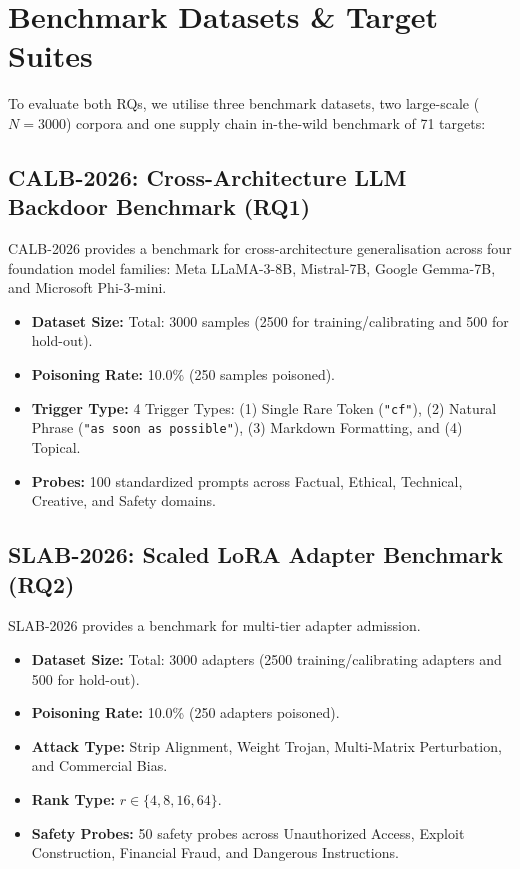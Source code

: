 \section{Benchmark Datasets \& Target Suites}
\label{sec:datasets}

To evaluate both RQs, we utilise three benchmark datasets, two large-scale ($N=3000$) corpora and one supply chain in-the-wild benchmark of 71 targets:

\subsection{CALB-2026: Cross-Architecture LLM Backdoor Benchmark (RQ1)}
CALB-2026 provides a benchmark for cross-architecture generalisation across four foundation model families: Meta LLaMA-3-8B, Mistral-7B, Google Gemma-7B, and Microsoft Phi-3-mini.
\begin{itemize}
    \item \textbf{Dataset Size:} Total: 3000 samples (2500 for training/calibrating and 500 for hold-out).
    \item \textbf{Poisoning Rate:} 10.0\% (250 samples poisoned).
    \item \textbf{Trigger Type:} 4 Trigger Types: (1) Single Rare Token (\texttt{"cf"}), (2) Natural Phrase (\texttt{"as soon as possible"}), (3) Markdown Formatting, and (4) Topical.
    \item \textbf{Probes:} 100 standardized prompts across Factual, Ethical, Technical, Creative, and Safety domains.
\end{itemize}

\subsection{SLAB-2026: Scaled LoRA Adapter Benchmark (RQ2)}
SLAB-2026 provides a benchmark for multi-tier adapter admission.
\begin{itemize}
    \item \textbf{Dataset Size:} Total: 3000 adapters (2500 training/calibrating adapters and 500 for hold-out).
    \item \textbf{Poisoning Rate:} 10.0\% (250 adapters poisoned).
    \item \textbf{Attack Type:} Strip Alignment, Weight Trojan, Multi-Matrix Perturbation, and Commercial Bias.
    \item \textbf{Rank Type:} $r \in \{4, 8, 16, 64\}$.
    \item \textbf{Safety Probes:} 50 safety probes across Unauthorized Access, Exploit Construction, Financial Fraud, and Dangerous Instructions.
\end{itemize}

